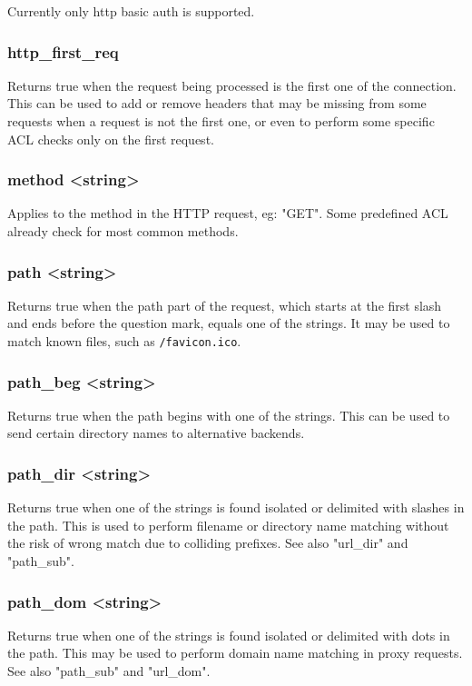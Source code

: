   Currently only http basic auth is supported.

\subsubsection{http\_first\_req}
  Returns true when the request being processed is the first one of the
  connection. This can be used to add or remove headers that may be missing
  from some requests when a request is not the first one, or even to perform
  some specific ACL checks only on the first request.

\subsubsection[method]{method <string>}
  Applies to the method in the HTTP request, eg: "GET". Some predefined ACL
  already check for most common methods.

\subsubsection[path]{path <string>}
  Returns true when the path part of the request, which starts at the first
  slash and ends before the question mark, equals one of the strings. It may be
  used to match known files, such as \verb|/favicon.ico|.

\subsubsection[path\_beg]{path\_beg <string>}
  Returns true when the path begins with one of the strings. This can be used
  to send certain directory names to alternative backends.

\subsubsection[path\_dir]{path\_dir <string>}
  Returns true when one of the strings is found isolated or delimited with
  slashes in the path. This is used to perform filename or directory name
  matching without the risk of wrong match due to colliding prefixes. See also
  "url\_dir" and "path\_sub".

\subsubsection[path\_dom]{path\_dom <string>}
  Returns true when one of the strings is found isolated or delimited with dots
  in the path. This may be used to perform domain name matching in proxy
  requests. See also "path\_sub" and "url\_dom".

